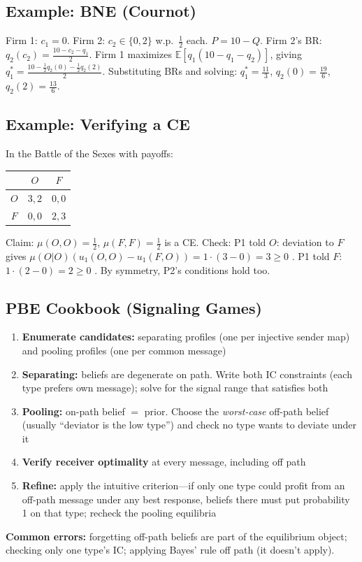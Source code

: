 \subsection{Example: BNE (Cournot)}
Firm 1: $c_1=0$. Firm 2: $c_2 \in \{0,2\}$ w.p.\ $\frac{1}{2}$ each. $P=10-Q$. Firm 2's BR: $q_2(c_2)= \frac{10-c_2-q_1}{2}$. Firm 1 maximizes $\mathbb{E}[q_1(10-q_1-q_2)]$, giving $q_1^* = \frac{10 - \frac{1}{2}q_2(0) - \frac{1}{2}q_2(2)}{2}$. Substituting BRs and solving: $q_1^* = \frac{11}{3}$, $q_2(0)=\frac{19}{6}$, $q_2(2)=\frac{13}{6}$.

\subsection{Example: Verifying a CE}
In the Battle of the Sexes with payoffs:
\begin{center}
\begin{tabular}{c|cc}
 & $O$ & $F$ \\ \hline
$O$ & $3,2$ & $0,0$ \\
$F$ & $0,0$ & $2,3$
\end{tabular}
\end{center}
Claim: $\mu(O,O)=\frac{1}{2},\, \mu(F,F)=\frac{1}{2}$ is a CE. Check: P1 told $O$: deviation to $F$ gives $\mu(O|O)(u_1(O,O)-u_1(F,O))= 1\cdot(3-0)=3 \geq 0$ \checkmark. P1 told $F$: $1\cdot(2-0)=2\geq 0$ \checkmark. By symmetry, P2's conditions hold too.

\subsection{PBE Cookbook (Signaling Games)}
\begin{enumerate}[nosep]
    \item \textbf{Enumerate candidates:} separating profiles (one per injective sender map) and pooling profiles (one per common message)
    \item \textbf{Separating:} beliefs are degenerate on path. Write both IC constraints (each type prefers own message); solve for the signal range that satisfies both
    \item \textbf{Pooling:} on-path belief $=$ prior. Choose the \textit{worst-case} off-path belief (usually ``deviator is the low type'') and check no type wants to deviate under it
    \item \textbf{Verify receiver optimality} at every message, including off path
    \item \textbf{Refine:} apply the intuitive criterion---if only one type could profit from an off-path message under any best response, beliefs there must put probability 1 on that type; recheck the pooling equilibria
\end{enumerate}
\textbf{Common errors:} forgetting off-path beliefs are part of the equilibrium object; checking only one type's IC; applying Bayes' rule off path (it doesn't apply).

